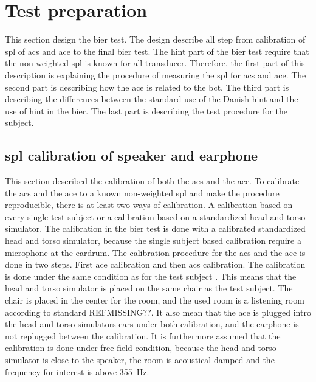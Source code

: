 


\section{Test preparation}
This section design the \gls{bier} test. The design describe all step from calibration of \gls{spl} of \gls{acs} and  \gls{ace} to the final \gls{bier} test. The \gls{hint} part of the \gls{bier} test require that the non-weighted \gls{spl} is known for all transducer. Therefore, the first part of this description is explaining the procedure of measuring the \gls{spl} for \gls{acs} and \gls{ace}. The second part is describing how the \gls{ace} is related to the \gls{bct}. The third part is describing the differences between the standard use of the Danish \gls{hint} and the use of \gls{hint} in the \gls{bier}. The last part is describing the test procedure for the subject. 





\subsection{\gls{spl} calibration of speaker and earphone}
This section described the calibration of both the \gls{acs} and the \gls{ace}. To calibrate the \gls{acs} and the \gls{ace} to a known non-weighted \gls{spl} and make the procedure reproducible, there is at least two ways of calibration. A calibration based on every single test subject or a calibration based on a standardized head and torso simulator. The calibration in the \gls{bier} test is done with a calibrated standardized head and torso simulator, because the single subject based calibration require a microphone at the eardrum. The calibration procedure for the \gls{acs} and the \gls{ace} is done in two steps. First \gls{ace} calibration and then \gls{acs} calibration. The calibration is done under the same condition as for the test subject . This means that the head and torso simulator is placed on the same chair as the test subject. The chair is placed in the center for the room, and the used room is a listening room according to standard REFMISSING??. It also mean that the \gls{ace} is plugged intro the head and torso simulators ears under both calibration, and the earphone is not replugged between the calibration. It is furthermore assumed that the calibration is done under free field condition, because the head and torso simulator is close to the speaker, the room is acoustical damped and the frequency for interest is above \SI{355}{\hertz}. 


